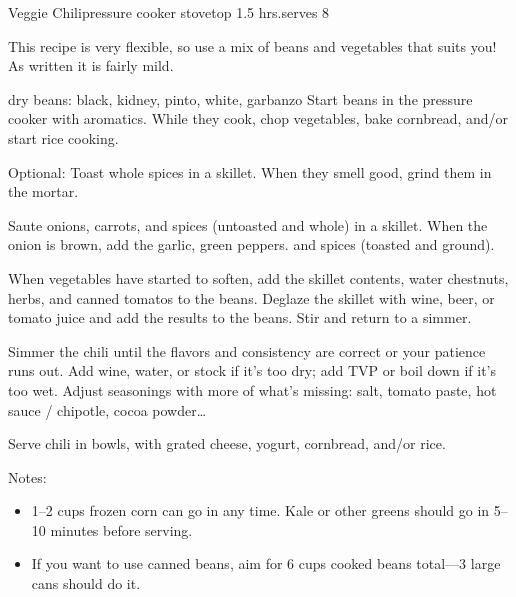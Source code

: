 \begin{recipe}{Veggie Chili}{pressure cooker \hfill stovetop \hfill 1.5 hrs.}{serves 8}

 \freeform This recipe is very flexible, so use a mix of beans and vegetables that suits you! As written it is fairly mild.

  {dry beans: black, kidney, pinto, white, garbanzo}
 Start beans in the pressure cooker with aromatics. While they cook, chop vegetables, bake cornbread, and/or start rice cooking.

 Optional: Toast whole spices in a skillet. When they smell good, grind them in the mortar.

 Saute onions, carrots, and spices (untoasted and whole) in a skillet. When the onion is brown, add the garlic, green peppers. and spices (toasted and ground).

 When vegetables have started to soften, add the skillet contents, water chestnuts, herbs, and canned tomatos to the beans. Deglaze the skillet with wine, beer, or tomato juice and add the results to the beans. Stir and return to a simmer.

 Simmer the chili until the flavors and consistency are correct or your patience runs out. Add wine, water, or stock if it's too dry; add TVP or boil down if it's too wet. Adjust seasonings with more of what's missing: salt, tomato paste, hot sauce / chipotle, cocoa powder\dots

 \newstep Serve chili in bowls, with grated cheese, yogurt, cornbread, and/or rice.

 \freeform Notes:
 \begin{itemize}
  \item 1--2 cups frozen corn can go in any time. Kale or other greens should go in 5--10 minutes before serving.
  \item If you want to use canned beans, aim for 6 cups cooked beans total---3 large cans should do it.
 \end{itemize}
\end{recipe}
